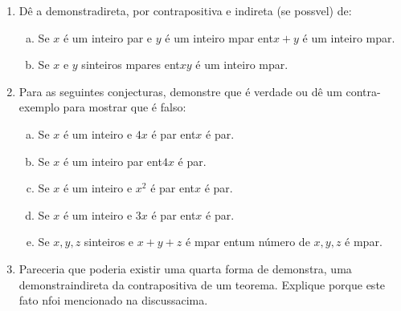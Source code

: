 \begin{enumerate}[{\bf 1.}]
\item D\^e a demonstra\cao direta, por contrapositiva e indireta (se poss\ih vel) de:
\begin{enumerate}[a)]
\item Se $x$ \'e um inteiro par e $y$ \'e um inteiro \ih mpar ent\ao $x+y$ \'e um inteiro \ih mpar. 
\item Se $x$ e $y$ s\ao inteiros \ih mpares ent\ao $xy$ \'e um inteiro \ih mpar.
\end{enumerate}

\item Para as seguintes conjecturas, demonstre que \'e verdade ou d\^e um contra-exemplo para mostrar que \'e falso: 
\begin{enumerate}[a)]
\item Se $x$ \'e um inteiro e $4x$ \'e par ent\ao $x$ \'e par.
\item Se $x$ \'e um inteiro par ent\ao $4x$ \'e par.
\item Se $x$ \'e um inteiro e $x^2$ \'e par ent\ao $x$ \'e par.
\item Se $x$ \'e um inteiro e $3x$ \'e par ent\ao $x$ \'e par.
\item Se $x,y,z$ s\ao inteiros e $x+y+z$ \'e \ih mpar ent\ao um n\'umero de $x,y,z$ \'e \ih mpar.
\end{enumerate}

\item Pareceria que poderia existir uma quarta forma de demonstra\caoi, uma demonstra\cao indireta da contrapositiva de um teorema. Explique porque este fato n\ao foi mencionado na discuss\ao acima.
\end{enumerate}
